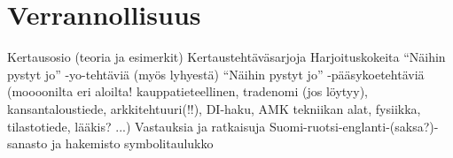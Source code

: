 \chapter{Verrannollisuus}

    Kertausosio (teoria ja esimerkit)
    Kertaustehtäväsarjoja
    Harjoituskokeita
    “Näihin pystyt jo” -yo-tehtäviä (myös lyhyestä)
    “Näihin pystyt jo” -pääsykoetehtäviä (moooonilta eri     aloilta! kauppatieteellinen, tradenomi (jos löytyy), kansantaloustiede, arkkitehtuuri(!!), DI-haku, AMK tekniikan alat, fysiikka, tilastotiede, lääkis? ...)
    Vastauksia ja ratkaisuja
    Suomi-ruotsi-englanti-(saksa?)-sanasto ja hakemisto
    symbolitaulukko

